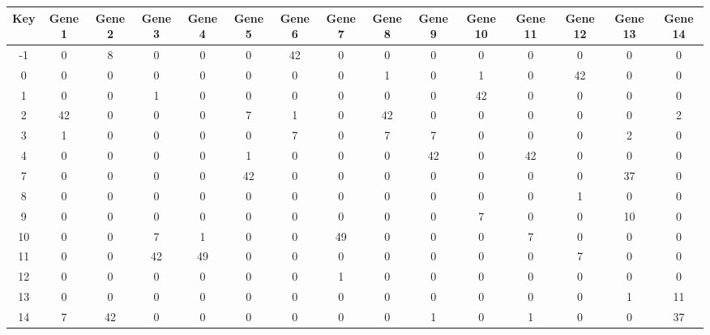 \begin{tabular}{|c|c|c|c|c|c|c|c|c|c|c|c|c|c|c|}
\hline
Key & Gene 1 & Gene 2 & Gene 3 & Gene 4 & Gene 5 & Gene 6 & Gene 7 & Gene 8 & Gene 9 & Gene 10 & Gene 11 & Gene 12 & Gene 13 & Gene 14 \\
\hline
-1 & 0 & 8 & 0 & 0 & 0 & 42 & 0 & 0 & 0 & 0 & 0 & 0 & 0 & 0 \\
0 & 0 & 0 & 0 & 0 & 0 & 0 & 0 & 1 & 0 & 1 & 0 & 42 & 0 & 0 \\
1 & 0 & 0 & 1 & 0 & 0 & 0 & 0 & 0 & 0 & 42 & 0 & 0 & 0 & 0 \\
2 & 42 & 0 & 0 & 0 & 7 & 1 & 0 & 42 & 0 & 0 & 0 & 0 & 0 & 2 \\
3 & 1 & 0 & 0 & 0 & 0 & 7 & 0 & 7 & 7 & 0 & 0 & 0 & 2 & 0 \\
4 & 0 & 0 & 0 & 0 & 1 & 0 & 0 & 0 & 42 & 0 & 42 & 0 & 0 & 0 \\
7 & 0 & 0 & 0 & 0 & 42 & 0 & 0 & 0 & 0 & 0 & 0 & 0 & 37 & 0 \\
8 & 0 & 0 & 0 & 0 & 0 & 0 & 0 & 0 & 0 & 0 & 0 & 1 & 0 & 0 \\
9 & 0 & 0 & 0 & 0 & 0 & 0 & 0 & 0 & 0 & 7 & 0 & 0 & 10 & 0 \\
10 & 0 & 0 & 7 & 1 & 0 & 0 & 49 & 0 & 0 & 0 & 7 & 0 & 0 & 0 \\
11 & 0 & 0 & 42 & 49 & 0 & 0 & 0 & 0 & 0 & 0 & 0 & 7 & 0 & 0 \\
12 & 0 & 0 & 0 & 0 & 0 & 0 & 1 & 0 & 0 & 0 & 0 & 0 & 0 & 0 \\
13 & 0 & 0 & 0 & 0 & 0 & 0 & 0 & 0 & 0 & 0 & 0 & 0 & 1 & 11 \\
14 & 7 & 42 & 0 & 0 & 0 & 0 & 0 & 0 & 1 & 0 & 1 & 0 & 0 & 37 \\
\hline
\end{tabular}